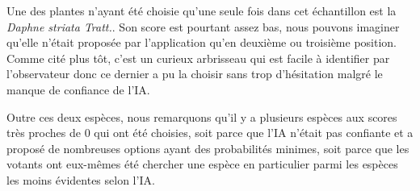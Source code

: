 \documentclass[a4paper,12pt]{article}
\begin{document}
\vspace{0.2cm}

Une des plantes n'ayant été choisie qu'une seule fois dans cet échantillon est la \textit{Daphne striata Tratt.}. Son score est pourtant assez bas, nous pouvons imaginer qu'elle n'était proposée par l'application qu'en deuxième ou troisième position. Comme cité plus tôt, c'est un curieux arbrisseau qui est facile à identifier par l'observateur donc ce dernier a pu la choisir sans trop d'hésitation malgré le manque de confiance de l'IA.

\vspace{0.2cm}

Outre ces deux espèces, nous remarquons qu'il y a plusieurs espèces aux scores très proches de $0$ qui ont été choisies, soit parce que l'IA n'était pas confiante et a proposé de nombreuses options ayant des probabilités minimes, soit parce que les votants ont eux-mêmes été chercher une espèce en particulier parmi les espèces les moins évidentes selon l'IA.

\end{document}

